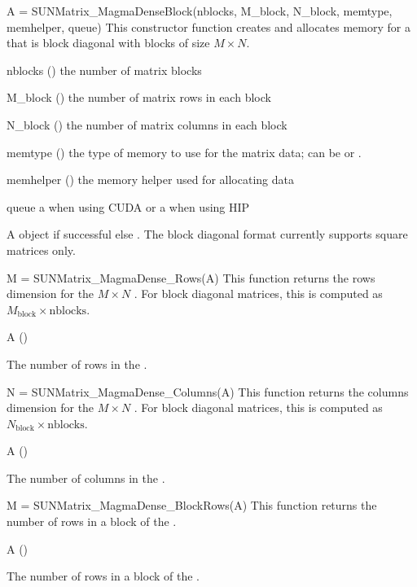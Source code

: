 {
  A = SUNMatrix\_MagmaDenseBlock(nblocks, M\_block, N\_block, memtype, memhelper, queue)
}
{
  This constructor function creates and allocates memory for a 
   that is block diagonal with  blocks of size
  $M \times N$.
}
{
  \begin{args}[memhelper]
  \item[nblocks] () the number of matrix blocks
  \item[M\_block] () the number of matrix rows in each block
  \item[N\_block] () the number of matrix columns in each block
  \item[memtype] () the type of memory to use for the matrix data; can be  or .
  \item[memhelper] () the memory helper used for allocating data
  \item[queue] a  when using CUDA or a  when using HIP
  \end{args}
}
{
  A  object if successful else .
}
{
  The block diagonal format currently supports square matrices only.
}

{
  M = SUNMatrix\_MagmaDense\_Rows(A)
}
{
  This function returns the rows dimension for the $M \times N$ .
  For block diagonal matrices, this is computed as $M_{\text{block}} \times \text{nblocks}$.
}
{
  \begin{args}
  \item[A] ()
  \end{args}
}
{
  The number of rows in the .
}
{}

{
  N = SUNMatrix\_MagmaDense\_Columns(A)
}
{
  This function returns the columns dimension for the $M \times N$ .
  For block diagonal matrices, this is computed as $N_{\text{block}} \times \text{nblocks}$.
}
{
  \begin{args}
  \item[A] ()
  \end{args}
}
{
  The number of columns in the .
}
{}

{
  M = SUNMatrix\_MagmaDense\_BlockRows(A)
}
{
  This function returns the number of rows in a block of the .
}
{
  \begin{args}
  \item[A] ()
  \end{args}
}
{
  The number of rows in a block of the .
}
{}

